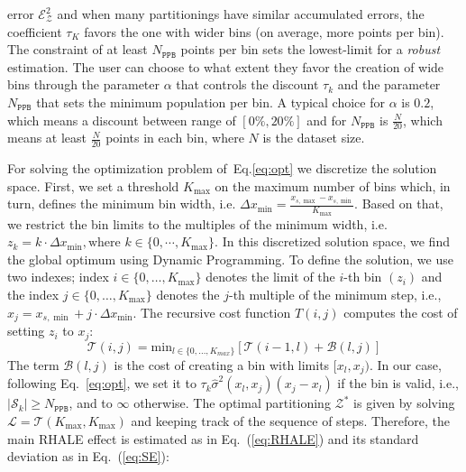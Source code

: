 \documentclass{ecai}  %
\begin{document}
error \(\mathcal{E}_{\mathcal{Z}}^2\) and when many partitionings have
similar accumulated errors, the coefficient \(\tau_K\) favors the one
with wider bins (on average, more points per bin). The constraint of
at least \(N_{\mathtt{PPB}}\) points per bin sets the lowest-limit for
a \textit{robust} estimation.  The user can choose to what extent they
favor the creation of wide bins through the parameter \(\alpha\) that
controls the discount \(\tau_k\) and the parameter
\(N_{\mathtt{PPB}}\) that sets the minimum population per bin. A
typical choice for \(\alpha\) is \(0.2\), which means a discount
between range of \([0\%, 20\%]\) and for \(N_{\mathtt{PPB}}\) is
\(\frac{N}{20}\), which means at least \(\frac{N}{20}\) points in each
bin, where \(N\) is the dataset size.



For solving the optimization problem of~Eq.\ref{eq:opt} we discretize the solution space.
First, we set a threshold \(K_{\max}\) on the maximum
number of bins which, in turn, defines the minimum bin width,
i.e. \(\Delta x_{\min} = \frac{x_{s, \max} - x_{s,\min}}{K_{\max}}\).
Based on that, we restrict the bin limits to the multiples of the
minimum width, i.e.
\(z_k = k\cdot \Delta x_{\min}, \text{where } k \in \{0 , \cdots,
K_{\max}\} \).
In this discretized solution space, we find the global
optimum using Dynamic Programming.
To define the solution, we use two indexes;
index
\(i \in \{0, \ldots, K_{\max}\}\) denotes the limit of the $i$-th
bin \((z_i)\) and the index \(j \in \{0, \ldots, K_{\max}\} \)
denotes the \(j\)-th multiple of the minimum step, i.e.,
\(x_j = x_{s,\min} + j \cdot \Delta x_{\min}\).
The recursive cost
function \(T(i,j)\) computes the cost of setting \(z_i\) to \(x_j\):
%
\begin{equation}
  \label{eq:recursive_cost}
  \mathcal{T}(i,j) = \mathrm{min}_{l \in \{0, \ldots, K_{max}\}} \left [ \mathcal{T}(i-1, l) + \mathcal{B}(l, j) \right ]
\end{equation}
%
The term \(\mathcal{B}(l, j)\) is the cost of creating a bin with
limits \([x_l, x_j)\).  In our case, following Eq.~\eqref{eq:opt}, we
set it to \(\tau_k \hat{\sigma}^2(x_l, x_j) (x_j-x_l)\) if the bin is
valid, i.e., \(|\mathcal{S}_k| \geq N_{\mathtt{PPB}}\), and to
\(\infty\) otherwise.  The optimal partitioning $\mathcal{Z}^*$ is
given by solving \(\mathcal{L} = \mathcal{T}(K_{\max}, K_{\max})\) and
keeping track of the sequence of steps. Therefore, the main RHALE
effect is estimated as in Eq.~(\ref{eq:RHALE}) and its standard
deviation as in Eq.~(\ref{eq:SE}):
\end{document}
